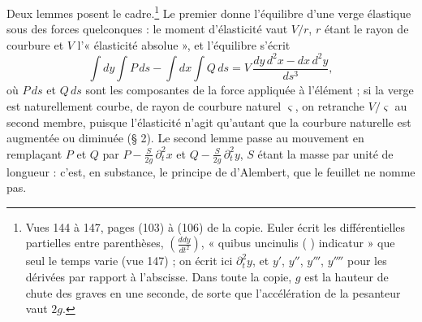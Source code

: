 \documentclass[11pt,a4paper]{article}
\begin{document}
Deux lemmes posent le cadre.\footnote{Vues 144 à 147, pages (103) à (106) de la copie. Euler écrit les différentielles partielles entre parenthèses, $\left(\frac{ddy}{dt^2}\right)$, « quibus uncinulis ( ) indicatur » que seul le temps varie (vue 147) ; on écrit ici $\partial_t^2 y$, et $y'$, $y''$, $y'''$, $y''''$ pour les dérivées par rapport à l'abscisse. Dans toute la copie, $g$ est la hauteur de chute des graves en une seconde, de sorte que l'accélération de la pesanteur vaut $2g$.} Le premier donne l'équilibre d'une verge élastique sous des forces quelconques : le moment d'élasticité vaut $V/r$, $r$ étant le rayon de courbure et $V$ l'« élasticité absolue », et l'équilibre s'écrit
\[
\int dy\int P\,ds-\int dx\int Q\,ds=V\,\frac{dy\,d^2x-dx\,d^2y}{ds^3},
\]
où $P\,ds$ et $Q\,ds$ sont les composantes de la force appliquée à l'élément ; si la verge est naturellement courbe, de rayon de courbure naturel $\varsigma$, on retranche $V/\varsigma$ au second membre, puisque l'élasticité n'agit qu'autant que la courbure naturelle est augmentée ou diminuée (§ 2). Le second lemme passe au mouvement en remplaçant $P$ et $Q$ par $P-\frac{S}{2g}\,\partial_t^2x$ et $Q-\frac{S}{2g}\,\partial_t^2y$, $S$ étant la masse par unité de longueur : c'est, en substance, le principe de d'Alembert, que le feuillet ne nomme pas.
\end{document}
